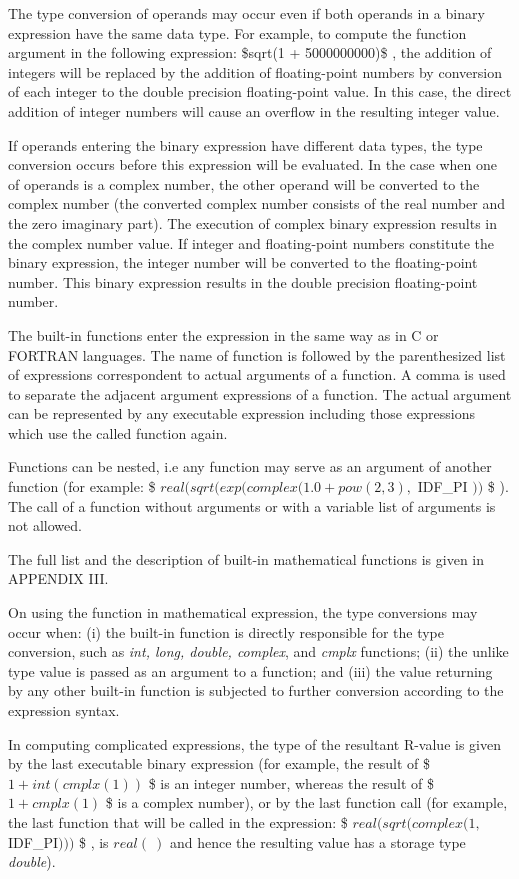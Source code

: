 The type conversion of operands may occur
even if both operands in a binary expression
have the same data type.
For example, to compute the function argument 
in the following expression: 
{
\$sqrt(1 + 5000000000)\$
},
the addition of integers will be replaced by the addition of floating-point
numbers by conversion of each integer to the double precision
floating-point value. 
In this case, the direct addition of integer numbers 
will cause an overflow in the resulting integer value.

If operands entering the binary expression
have different data types, the type conversion
occurs before this expression will be evaluated.
In the case when one of operands is a complex number, the other
operand will be converted to the complex number
(the converted complex number consists of the real number
and the zero imaginary part).
The execution of complex binary expression results in the
complex number value.
If integer and floating-point numbers
constitute the binary expression,
the integer number will be converted to the floating-point number.
This binary expression results in the double precision
floating-point number.


The built-in functions enter the expression in the same way
as in C or FORTRAN languages. The name of function is followed by the
parenthesized list of expressions correspondent to actual arguments
of a function. A comma is used to separate the adjacent argument
expressions of a function. The actual argument can be
represented by any executable expression including those expressions
which use the called function again.

Functions can be nested, i.e any function may serve as an argument
of another function (for example:
{
\$ $real (sqrt (exp (complex( 1.0+pow(2,3),$ IDF\_PI $))$ \$
}).
The call of a function without arguments or with
a variable list of arguments is not allowed.

The full list and the description of built-in mathematical functions
is given in APPENDIX III.

On using the function in mathematical expression, 
the type conversions may occur when: 
(i) the built-in function is directly responsible for the type conversion,
such as {\it int, long, double, complex}, and {\it cmplx} functions;
(ii) the unlike type value is passed as an argument
to a function; 
and
(iii) the value returning by any other built-in function
is subjected to further conversion according to the expression syntax.

In computing complicated expressions, the type of the resultant R-value
is given by the last executable binary expression (for example, the result of
\$ $1+int(cmplx(1))$ \$ is an integer number,
whereas the result of \$ $1+cmplx(1)$ \$ is a complex number),
or by the last function call (for example, the last function
that will be called in the expression:
{
\$ $real(sqrt(complex(1,$IDF\_PI$)))$ \$
},
is $real(\ )$ and hence the resulting value has a storage type {\it double}).

